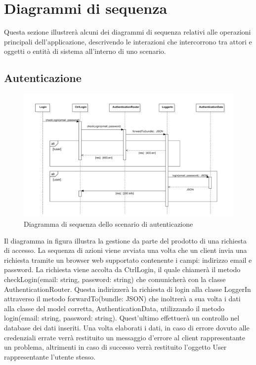 \documentclass[a4paper, titlepage]{article}
\begin{document}
\newpage
\section{Diagrammi di sequenza}
	Questa sezione illustrerà alcuni dei diagrammi di sequenza relativi alle operazioni principali
	dell'applicazione, descrivendo le interazioni che intercorrono tra attori e oggetti o entità di
	sistema all'interno di uno scenario.
	
	\subsection{Autenticazione}
	\begin{figure}[!h]
		\centering
		\includegraphics[scale=0.5]{Img/seq-login.pdf}
		\caption{Diagramma di sequenza dello scenario di autenticazione}
	\end{figure}
	Il diagramma in figura illustra la gestione da parte del prodotto di una richiesta di accesso. La sequenza di azioni viene avviata una volta che un client invia una richiesta tramite un browser web supportato contenente i campi: indirizzo email e password.
	La richiesta viene accolta da CtrlLogin, il quale chiamerà il metodo checkLogin(email: string, password: string) che comunicherà con la classe AuthenticationRouter. Questa indirizzerà la richiesta di login alla classe LoggerIn attraverso il metodo forwardTo(bundle: JSON) che inoltrerà a sua volta i dati alla classe del model corretta, AuthenticationData, utilizzando il metodo login(email: string, password: string). Quest'ultimo effettuerà un controllo nel database dei dati inseriti. Una volta elaborati i dati, in caso di errore dovuto alle credenziali errate verrà restituito un messaggio d'errore al client rappresentante un problema, altrimenti in caso di successo verrà restituito l'oggetto User rappresentante l'utente stesso.
	
\end{document}
